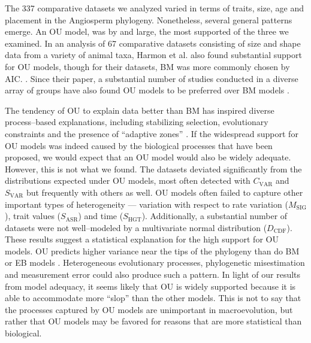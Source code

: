 \documentclass[a4paper,11pt]{article}
\begin{document}
{The 337 comparative datasets we analyzed varied in terms of traits, size, age and placement in the Angiosperm phylogeny. Nonetheless, several general patterns emerge. An OU model, was by and large, the most supported of the three we examined. In an analysis of 67 comparative datasets consisting of size and shape data from a variety of animal taxa, Harmon et al. \citep{Harmon2010} also found substantial support for OU models, though for their datasets, BM was more commonly chosen by AIC. \citep[We note, however, that many of their datasets were quite small; see][]{SlaterPennell}. Since their paper, a substantial number of studies conducted in a diverse array of groups have also found OU models to be preferred over BM models \citep[e.g.,][]{Burbrink2012, Wiens2013, Lopez2013, Thomaspreprint}. 

The tendency of OU to explain data better than BM has inspired diverse process--based explanations, including stabilizing selection, evolutionary constraints and the presence of ``adaptive zones'' \citep{HansenMartins1996, ButlerKing2004, Hansen2012book, PennellHarmon}. 
If the widespread support for OU models was indeed caused by the biological processes that have been proposed, we would expect that an OU model would also be widely adequate. However, this is not what we found. The datasets deviated significantly from the distributions expected under OU models, most often detected with $C_{\text{VAR}}$ and $S_{\text{VAR}}$ but frequently with others as well. OU models often failed to capture other important types of heterogeneity --- variation with respect to rate variation ($M_{\text{SIG}}$), trait values ($S_{\text{ASR}}$) and time ($S_{\text{HGT}}$). Additionally, a substantial number of datasets were not well--modeled by a multivariate normal distribution ($D_{\text{CDF}}$). These results suggest a statistical explanation for the high support for OU models. OU predicts higher variance near the tips of the phylogeny than do BM or EB models \citep[see figure 1 in][]{Harmon2010}. Heterogeneous evolutionary processes, phylogenetic misestimation and measurement error could also produce such a pattern. In light of our results from model adequacy, it seems likely that OU is widely supported because it is able to accommodate more ``slop'' than the other models.  This is not to say that the processes captured by OU models are unimportant in macroevolution, but rather that OU models may be favored for reasons that are more statistical than biological.

}
\end{document}
